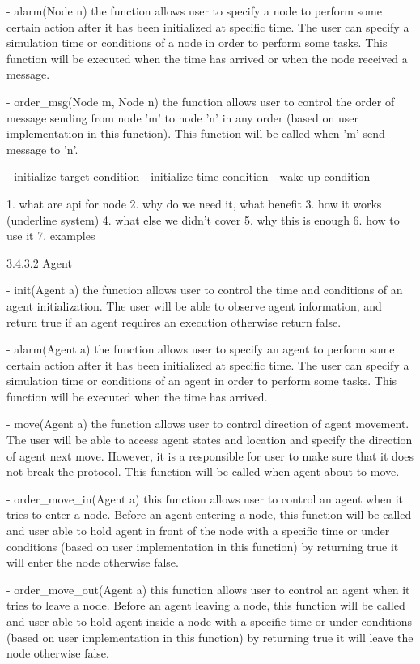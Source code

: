 \begin{description}
\begin{description}
\begin{description}
\begin{description}
- alarm(Node n) the function allows user to specify a node to perform some certain action after it has been initialized at specific time. The user can specify a simulation time or conditions of a node in order to perform some tasks. This function will be executed when the time has arrived or when the node received a message.

- order_msg(Node m, Node n) the function allows user to control the order of message sending from node 'm' to node 'n' in any order (based on user implementation in this function). This function will be called when 'm' send message to 'n'.


- initialize target condition
- initialize time condition
- wake up condition

1. what are api for node
2. why do we need it, what benefit
3. how it works (underline system)
4. what else we didn't cover
5. why this is enough
6. how to use it
7. examples


3.4.3.2 Agent

- init(Agent a) the function allows user to control the time and conditions of an agent initialization. The user will be able to observe agent information, and return true if an agent requires an execution otherwise return false.

- alarm(Agent a) the function allows user to specify an agent to perform some certain action after it has been initialized at specific time. The user can specify a simulation time or conditions of an agent in order to perform some tasks. This function will be executed when the time has arrived.

- move(Agent a) the function allows user to control direction of agent movement. The user will be able to access agent states and location and specify the direction of agent next move. However, it is a responsible for user to make sure that it does not break the protocol. This function will be called when agent about to move.
	
- order_move_in(Agent a) this function allows user to control an agent when it tries to enter a node. Before an agent entering a node, this function will be called and user able to hold agent in front of the node with a specific time or under conditions (based on user implementation in this function) by returning true it will enter the node otherwise false.

- order_move_out(Agent a) this function allows user to control an agent when it tries to leave a node. Before an agent leaving a node, this function will be called and user able to hold agent inside a node with a specific time or under conditions (based on user implementation in this function) by returning true it will leave the node otherwise false.



\end{description}
\end{description}
\end{description}
\end{description}
